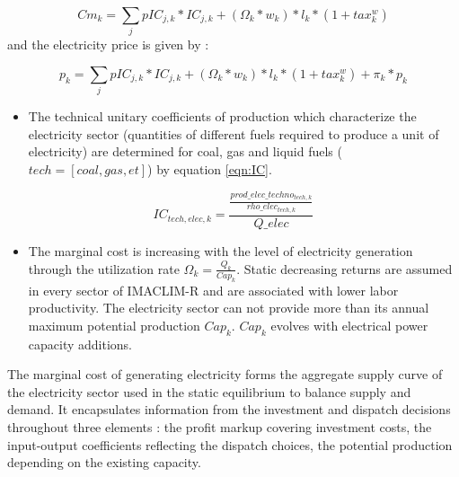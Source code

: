 \begin{dmath}
    Cm_{k} = \sum_{j}{}pIC_{j,k}*IC_{j,k} + (\Omega_{k}*w_{k})*l_{k}*(1+tax_{k}^{w})
    \label{eqn:Cm}
\end{dmath}
and the electricity price is given by : 

\begin{dmath}
    p_{k} = \sum_{j}{}pIC_{j,k}*IC_{j,k} + (\Omega_{k}*w_{k})*l_{k}*(1+tax_{k}^{w}) + \pi_{k} * p_{k}
    \label{eqn:Cm}
\end{dmath}
\begin{itemize}
    \item The technical unitary coefficients of production which characterize the electricity sector (quantities of different fuels required to produce a unit of electricity) are determined for coal, gas and liquid fuels ($tech = [coal,gas,et]$) by equation \ref{eqn:IC}.
\end{itemize}


\begin{dmath}
    IC_{tech,elec,k} = \frac{\frac{prod\_elec\_techno_{tech,k}}{rho\_elec_{tech,k}}}{Q\_elec}
    \label{eqn:IC}
\end{dmath}

\begin{itemize}
    \item The marginal cost is increasing with the level of electricity generation through the utilization rate $\Omega_{k} = \frac{Q_{k}}{Cap_{k}}$. Static decreasing returns are assumed in every sector of IMACLIM-R and are associated with lower labor productivity. The electricity sector can not provide more than its annual maximum potential production $Cap_{k}$.
$Cap_{k}$ evolves with electrical power capacity additions.
\end{itemize}

The marginal cost of generating electricity forms the aggregate supply curve of the electricity sector used in the static equilibrium to balance supply and demand. It encapsulates information from the investment and dispatch decisions throughout three elements : the profit markup covering investment costs, the input-output coefficients reflecting the dispatch choices, the potential production depending on the existing capacity. 

